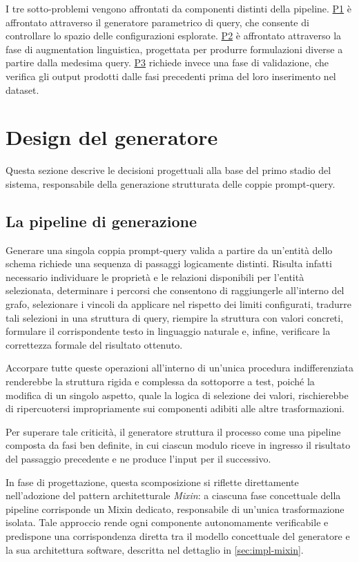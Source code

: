 \documentclass[12pt,a4paper,openright,twoside]{book}
\begin{document}
I tre sotto-problemi vengono affrontati da componenti distinti della pipeline.
\hyperref[prob:P1]{P1} è affrontato attraverso il generatore parametrico di
query, che consente di controllare lo spazio delle configurazioni esplorate.
\hyperref[prob:P2]{P2} è affrontato attraverso la fase di augmentation
linguistica, progettata per produrre formulazioni diverse a partire dalla
medesima query. \hyperref[prob:P3]{P3} richiede invece una fase di validazione,
che verifica gli output prodotti dalle fasi precedenti prima del loro
inserimento nel dataset.

\section{Design del generatore}

Questa sezione descrive le decisioni progettuali alla base del primo stadio del
sistema, responsabile della generazione strutturata delle coppie prompt-query.

\subsection{La pipeline di generazione}
\label{sec:design-pipeline}

Generare una singola coppia prompt-query valida a partire da un'entità dello
schema richiede una sequenza di passaggi logicamente distinti. Risulta infatti
necessario individuare le proprietà e le relazioni disponibili per l'entità
selezionata, determinare i percorsi che consentono di raggiungerle all'interno
del grafo, selezionare i vincoli da applicare nel rispetto dei limiti
configurati, tradurre tali selezioni in una struttura di query, riempire la
struttura con valori concreti, formulare il corrispondente testo in linguaggio
naturale e, infine, verificare la correttezza formale del risultato ottenuto.

Accorpare tutte queste operazioni all'interno di un'unica procedura
indifferenziata renderebbe la struttura rigida e complessa da sottoporre a test,
poiché la modifica di un singolo aspetto, quale la logica di selezione dei
valori, rischierebbe di ripercuotersi impropriamente sui componenti adibiti alle
altre trasformazioni.

Per superare tale criticità, il generatore struttura il processo come una
pipeline composta da fasi ben definite, in cui ciascun modulo riceve in ingresso
il risultato del passaggio precedente e ne produce l'input per il successivo.

In fase di progettazione, questa scomposizione si riflette direttamente
nell'adozione del pattern architetturale \textit{Mixin}: a ciascuna fase
concettuale della pipeline corrisponde un Mixin dedicato, responsabile di
un'unica trasformazione isolata. Tale approccio rende ogni componente
autonomamente verificabile e predispone una corrispondenza diretta tra il
modello concettuale del generatore e la sua architettura software, descritta nel
dettaglio in \cref{sec:impl-mixin}.
\end{document}
